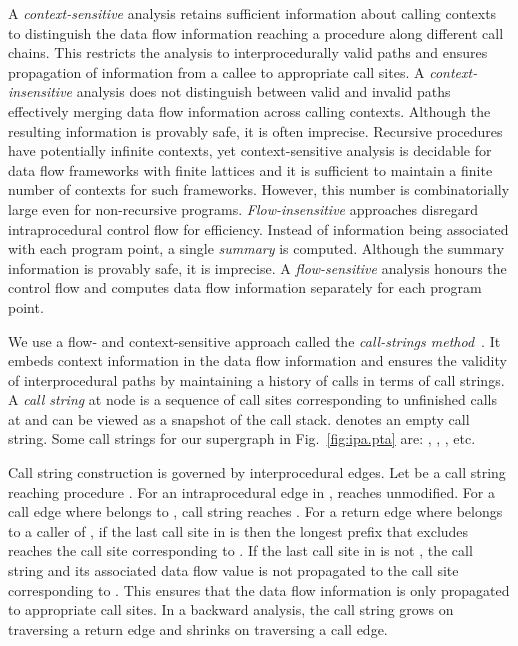 \documentclass{llncs}
\newcommand{\callpt}[1]{\mbox{}}
\newcommand{\retpt}[1]{\mbox{}}
\newcommand{\Start}[1]{\text{{\sf\em start}}\xspace}
\begin{document}
A {\em context-sensitive\/} analysis retains sufficient
information about calling contexts to distinguish the data flow
information reaching a procedure along different call chains. This
restricts the analysis to interprocedurally valid paths and 
ensures propagation of information from a callee to
appropriate call sites.
A {\em context-insensitive\/} analysis
does not distinguish between valid and invalid paths 
effectively merging data flow
information across calling contexts. Although the resulting information
is provably safe, it is often imprecise. Recursive procedures have
potentially infinite contexts, yet context-sensitive analysis is decidable
for data flow frameworks with finite lattices and it is sufficient to
maintain a finite number of contexts for such frameworks. However, this
number is combinatorially large even for non-recursive programs.
{\em Flow-insensitive\/} approaches disregard intraprocedural control flow
for efficiency. Instead of information being associated with each
program point, a single {\em summary} is computed. Although the summary
information is provably safe, it is imprecise. A {\em flow-sensitive\/} analysis
honours the control flow and computes data flow information separately
for each program point.



We use a flow- and context-sensitive 
approach called the {\em call-strings method\/}~\cite{Sharir.M.Pnueli.A:1981:Two-Approaches-to,Khedker.U.Sanyal.A.Karkare.B:2009:Data-Flow-Analysis,Khedker.UP.Karkare.B:2008:Efficiency-Precision-Simplicity}. It embeds
context information in the data flow information and ensures the
validity of interprocedural paths by maintaining a history of calls in
terms of call strings. A {\em call string\/} at node  is a sequence
 of call sites corresponding to unfinished calls
at  and can be viewed as a snapshot of the call stack. 
denotes an empty call string. Some call strings for our supergraph
in Fig.~\ref{fig:ipa.pta} are: , , \text{},
\text{} etc.


Call string construction is governed by interprocedural edges. 
Let  be a call string reaching procedure . For
an intraprocedural edge  in ,  reaches 
unmodified. For a call edge \text{}
where \callpt{i} belongs to , call string  reaches
\Start{q}. For a return edge \text{} where
\retpt{j} belongs to a caller of , if the last call site in 
is  then the longest prefix that excludes  reaches the call
site corresponding to \retpt{j}. If the last call site in  is
not , the call string and its associated data flow value is not
propagated to the call site corresponding to \retpt{j}. This ensures
that the data flow information is only propagated to appropriate call sites.
In a backward analysis, the call string grows on traversing a return
edge and shrinks on traversing a call edge.
\end{document}

